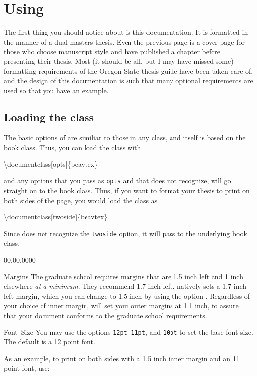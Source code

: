 

\chapter{Using \beavtex}

The first thing you should notice about \beavtex is this documentation.
It is formatted in the manner of a dual masters thesis. Even the previous
page is a cover page for those who choose manuscript style and have
published a chapter before presenting their thesis. Most (it should
be all, but I may have missed some) formatting requirements of the
Oregon State thesis guide have been taken care of, and the design
of this documentation is such that many optional requirements are
used so that you have an example.


\section{Loading the class}

The basic options of \beavtex are similiar to those in any class,
and \beavtex itself is based on the book class. Thus, you can load
the class with

\begin{lyxcode}
\textbackslash{}documentclass{[}opts{]}\{beavtex\}
\end{lyxcode}
and any options that you pass as \texttt{opts} and that \beavtex
does not recognize, will go straight on to the book class. Thus, if
you want to format your thesis to print on both sides of the page,
you would load the class as

\begin{lyxcode}
\textbackslash{}documentclass{[}twoside{]}\{beavtex\}
\end{lyxcode}
Since \beavtex does not recognize the \texttt{twoside} option, it
will pass to the underlying book class. 

\begin{lyxlist}{00.00.0000}
\item [Margins]The graduate school requires margins that are 1.5 inch left
and 1 inch elsewhere \emph{at a minimum}. They recommend 1.7 inch
left. \beavtex natively sets a 1.7 inch left margin, which you can
change to 1.5 inch by using the option \texttt{}. Regardless
of your choice of inner margin, \beavtex will set your outer margins
at 1.1 inch, to assure that your document conforms to the graduate
school requirements.
\item [Font~Size]You may use the options \texttt{12pt}, \noun{}\texttt{11pt},
\noun{}and \noun{}\texttt{10pt} to set the base font size. The
default is a 12 point font. 
\end{lyxlist}
As an example, to print on both sides with a 1.5 inch inner margin
and an 11 point font, use:

